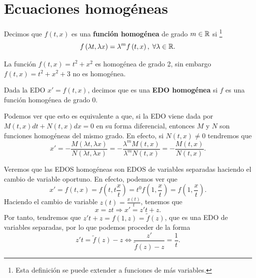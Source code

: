 \section{Ecuaciones homogéneas}
\begin{definition}
Decimos que $\displaystyle f\left(t,x\right) $ es una \textbf{función homogénea} de grado $\displaystyle m \in \mathbb{R} $ si \footnote{Esta definición se puede extender a funciones de más variables.} 
\[f\left(\lambda t, \lambda x\right)= \lambda^{m}f\left(t,x\right), \; \forall \lambda \in \mathbb{R} .\]
\end{definition}
\begin{eg}
La función $\displaystyle f\left(t,x\right) = t ^{2}+x^{2} $ es homogénea de grado 2, sin embargo $\displaystyle f\left(t,x\right) = t ^{2} + x^{2} + 3 $ no es homogénea.
\end{eg}
\begin{definition}
Dada la EDO $\displaystyle x'=f\left(t,x\right) $, decimos que es una \textbf{EDO homogénea} si $\displaystyle f $ es una función homogénea de grado 0.	
\end{definition}
\begin{observation}
Podemos ver que esto es equivalente a que, si la EDO viene dada por $\displaystyle M\left(t,x\right)dt + N\left(t,x\right)dx = 0 $ en su forma diferencial, entonces $\displaystyle M $ y $\displaystyle N $ son funciones homogéneas del mismo grado. En efecto, si $\displaystyle N\left(t,x\right)\neq 0 $ tendremos que 
\[ x'= -\frac{M\left(\lambda t,\lambda x\right)}{N\left(\lambda t,\lambda x\right)} = -\frac{\lambda^{m}M\left(t,x\right)}{\lambda^{m}N\left(t,x\right)}=-\frac{M\left(t,x\right)}{N\left(t,x\right)}.\]
\end{observation}
\begin{observation}
Veremos que las EDOS homogéneas son EDOS de variables separadas haciendo el cambio de variable oportuno. En efecto, podemos ver que 
\[x' = f\left(t,x\right)=f\left(t,t\frac{x}{t}\right) = t ^{0}f\left(1,\frac{x}{t}\right) = f\left(1, \frac{x}{t}\right).\]
Haciendo el cambio de variable $\displaystyle z\left(t\right) = \frac{x\left(t\right)}{t} $, tenemos que 
\[x=zt \Rightarrow x' = z't + z .\]
Por tanto, tendremos que $\displaystyle z't + z = f\left(1,z\right) = \tilde{f}\left(z\right) $, que es una EDO de variables separadas, por lo que podemos proceder de la forma
\[z't = \tilde{f}\left(z\right) -z \iff \frac{z'}{\tilde{f}\left(z\right)-z}=\frac{1}{t} .\]
\end{observation}

